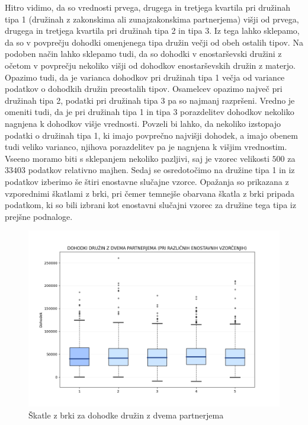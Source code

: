 \documentclass{article}
\begin{document}
Hitro vidimo, da so vrednosti prvega, drugega in tretjega kvartila pri družinah tipa 1 (družinah z zakonskima ali zunajzakonskima partnerjema) višji od prvega, drugega in tretjega kvartila pri družinah tipa 2 in tipa 3. 
Iz tega lahko sklepamo, da so v povprečju dohodki omenjenega tipa družin večji od obeh ostalih tipov. Na podoben način lahko sklepamo tudi, da so dohodki v enostarševski družini z očetom v povprečju nekoliko višji od dohodkov enostarševskih družin z materjo. 
Opazimo tudi, da je varianca dohodkov pri družinah tipa 1 večja od variance podatkov o dohodkih družin preostalih tipov. 
Osamelcev opazimo največ pri družinah tipa 2, podatki pri družinah tipa 3 pa so najmanj razpršeni. 
Vredno je omeniti tudi, da je pri družinah tipa 1 in tipa 3 porazdelitev dohodkov nekoliko nagnjena k dohodkov višje vrednosti.
\newline
Povzeli bi lahko, da nekoliko izstopajo podatki o družinah tipa 1, ki imajo povprečno najvišji dohodek, a imajo obenem tudi veliko varianco, njihova porazdelitev pa je nagnjena k višjim vrednostim.
Vseeno moramo biti s sklepanjem nekoliko pazljivi, saj je vzorec velikosti $500$ za $33403$ podatkov relativno majhen.
\newline
\newline
Sedaj se osredotočimo na družine tipa 1 in iz podatkov izberimo še štiri enostavne slučajne vzorce. 
Opažanja so prikazana z vzporednimi škatlami z brki, pri čemer temnejše obarvana škatla z brki pripada podatkom, ki so bili izbrani kot enostavni slučajni vzorec za družine tega tipa iz prejšne podnaloge.

\begin{figure}[H]
    \begin{center}
    \includegraphics[width=\linewidth]{naloga1b.png}
    \vspace*{-10mm}\caption{Škatle z brki za dohodke družin z dvema partnerjema}
    \end{center}    
\end{figure}
\end{document}
